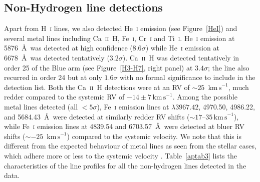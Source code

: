 \documentclass{aa}
\newcommand{\Hi}{H~\textsc{i}\xspace}
\newcommand{\Hei}{He~\textsc{i}\xspace}
\newcommand{\kms}{\ensuremath{\mathrm{km\,s}^{-1}}\xspace}
\begin{document}
\begin{appendix}
\section{Non-Hydrogen line detections}
Apart from \Hi lines, we also detected \Hei emission (see Figure~\ref{HeI}) and several metal lines including Ca~\textsc{ii}~H, Fe~\textsc{i}, Cr~\textsc{i} and Ti~\textsc{i}. \Hei emission at 5876~\AA\ was detected at high confidence ($8.6\sigma$) while \Hei emission at 6678~\AA\ was detected tentatively ($3.2\sigma$).
Ca~\textsc{ii}~H was detected tentatively in order 25 of the Blue arm (see Figure~\ref{H3-H7}, right panel) at $3.4\sigma$; the line also recurred in order 24 but at only $1.6\sigma$ with no formal significance to include in the detection list. Both the Ca~\textsc{ii}~H detections were at an RV of $\sim25$~\kms, much redder compared to the systemic RV of $-14\pm7\,\kms$.
Among the possible metal lines detected (all $<5\sigma$), Fe~\textsc{i} emission lines at $\lambda3967.42$, 4970.50, 4986.22, and 5684.43~\AA\ were detected at similarly redder RV shifts ($\sim17$--$35\,\kms$), while Fe~\textsc{i} emission lines at 4839.54 and 6703.57~\AA\ were detected at bluer RV shifts ($\sim-25$~\kms) compared to the systemic velocity. We note that this is different from the expected behaviour of metal lines as seen from the stellar cases, which adhere more or less to the systemic velocity \citep{sicilia2015}.
Table~\ref{aptab3} lists the characteristics of the line profiles for all the non-hydrogen lines detected in the data.


\end{appendix}
\end{document}

